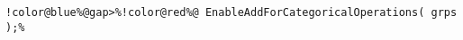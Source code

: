 \begin{Verbatim}[commandchars=!@\%,frame=single]
!color@blue%@gap>%!color@red%@ EnableAddForCategoricalOperations( grps );%
\end{Verbatim}
